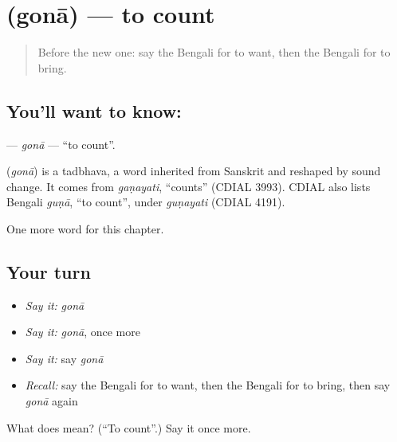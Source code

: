 \section[\texorpdfstring{\bn{গোনা} (gonā)}{গোনা (gonā)}]{ (gonā) — to count}

\label{lesson:BN-C51-gona}



\begin{quote}
Before the new one: say the Bengali for to want, then the Bengali for to bring.
\end{quote}

\subsection*{You'll want to know: }
\textbf{} — \emph{gonā} — \textquotedblleft{}to count\textquotedblright{}.

\begin{cousinweb}
\textbf{} (\emph{gonā}) is a tadbhava, a word inherited from Sanskrit and reshaped by sound change. It comes from \emph{gaṇayati}, \textquotedblleft{}counts\textquotedblright{} (CDIAL 3993). CDIAL also lists Bengali \emph{guṇā}, \textquotedblleft{}to count\textquotedblright{}, under \emph{guṇayati} (CDIAL 4191).
\end{cousinweb}

\begin{grammarlens}[title={What you've built}]
One more word for this chapter.
\end{grammarlens}

\subsection*{Your turn}
\begin{itemize}
\raggedright
  \item \emph{Say it:} \emph{gonā}
  \item \emph{Say it:} \emph{gonā}, once more
  \item \emph{Say it:} say \emph{gonā}
  \item \emph{Recall:} say the Bengali for to want, then the Bengali for to bring, then say \emph{gonā} again
\end{itemize}

\begin{tcolorbox}[breakable,colback=teal!4,colframe=teal!35!black,title={Before you move on}]
What does  mean? (\textquotedblleft{}To count\textquotedblright{}.) Say it once more.
\end{tcolorbox}
